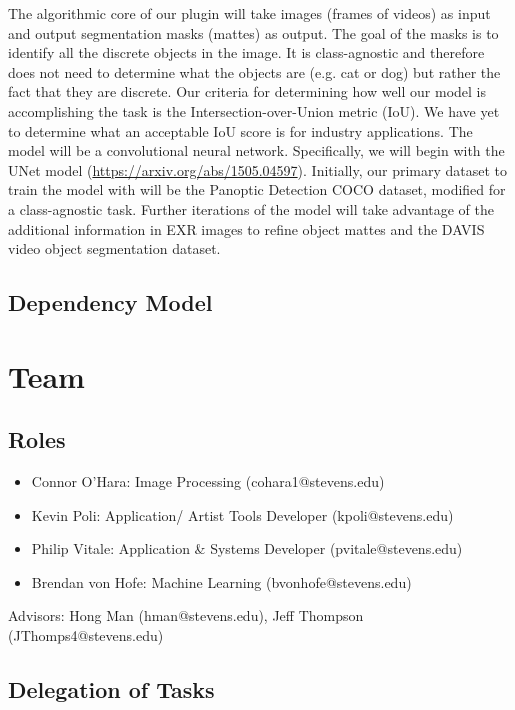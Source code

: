 \documentclass[11pt]{article}
\begin{document}
The algorithmic core of our plugin will take images (frames of videos) as input and output segmentation masks (mattes) as output. The goal of the masks is to identify all the discrete objects in the image. It is class-agnostic and therefore does not need to determine what the objects are (e.g. cat or dog) but rather the fact that they are discrete.
Our criteria for determining how well our model is accomplishing the task is the Intersection-over-Union metric (IoU). We have yet to determine what an acceptable IoU score is for industry applications.
The model will be a convolutional neural network. Specifically, we will begin with the UNet model (\url{https://arxiv.org/abs/1505.04597}). Initially, our primary dataset to train the model with will be the Panoptic Detection COCO dataset, modified for a class-agnostic task.
Further iterations of the model will take advantage of the additional information in EXR images to refine object mattes and the DAVIS video object segmentation dataset.

\subsection{Dependency Model}
\label{sec:org04cf880}
\begin{center}

\end{center}



\section{Team}
\label{sec:orgd19d869}
\subsection{Roles}
\label{sec:org4726946}
\begin{itemize}
\item Connor O’Hara: Image Processing (cohara1@stevens.edu)
\item Kevin Poli: Application/ Artist Tools Developer (kpoli@stevens.edu)
\item Philip Vitale: Application \& Systems Developer (pvitale@stevens.edu)
\item Brendan von Hofe: Machine Learning (bvonhofe@stevens.edu)
\end{itemize}

Advisors: Hong Man (hman@stevens.edu), Jeff Thompson (JThomps4@stevens.edu)


\subsection{Delegation of Tasks}
\label{sec:orge8e8cad}
\end{document}

